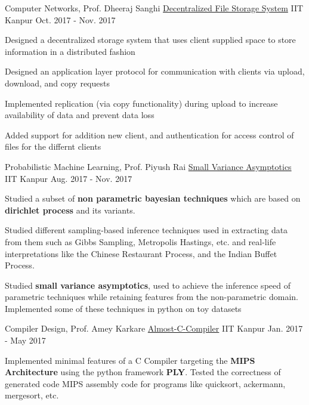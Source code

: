 \begin{cventries}
  \cventry
    {Computer Networks, Prof. Dheeraj Sanghi}
    {\href{https://bitbucket.org/arhamchopra11/decentralized_file_storage}{Decentralized File Storage System}}
    {IIT Kanpur}
    {Oct. 2017 - Nov. 2017}
    {
      \begin{cvitems}
        \item {Designed a decentralized storage system that uses client supplied space to store information in a distributed fashion}
        \item {Designed an application layer protocol for communication with clients via upload, download, and copy requests}
        \item {Implemented replication (via copy functionality) during upload to increase availability of data and prevent data loss}
        \item {Added support for addition new client, and authentication for access control of files for the differnt clients}
      \end{cvitems}
    }
  \cventry
    {Probabilistic Machine Learning, Prof. Piyush Rai}
    {\href{https://bitbucket.org/arhamchopra11/non-parametric-bayesian}{Small Variance Asymptotics}}
    {IIT Kanpur}
    {Aug. 2017 - Nov. 2017}
    {
      \begin{cvitems}
        \item {Studied a subset of \textbf{non parametric bayesian techniques} which are based on \textbf{dirichlet process} and its variants.}
        \item {Studied different sampling-based inference techniques used in extracting data from them such as Gibbs Sampling, Metropolis Hastings, etc. and real-life interpretations like the Chinese Restaurant Process, and the Indian Buffet Process.}
        \item {Studied \textbf{small variance asymptotics}, used to achieve the inference speed of parametric techniques while retaining features from the non-parametric domain. Implemented some of these techniques in python on toy datasets}
      \end{cvitems}
    }
  \cventry
    {Compiler Design, Prof. Amey Karkare}
    {\href{https://bitbucket.org/arhamchopra11/almost-c-compiler}{Almost-C-Compiler}}
    {IIT Kanpur}
    {Jan. 2017 - May 2017}
    {
      \begin{cvitems}
        \item {Implemented minimal features of a C Compiler targeting the \textbf{MIPS Architecture} using the python framework \textbf{PLY}. Tested the correctness of generated code MIPS assembly code for programs like quicksort, ackermann, mergesort, etc.}

\end{cvitems}}
\end{cventries}
